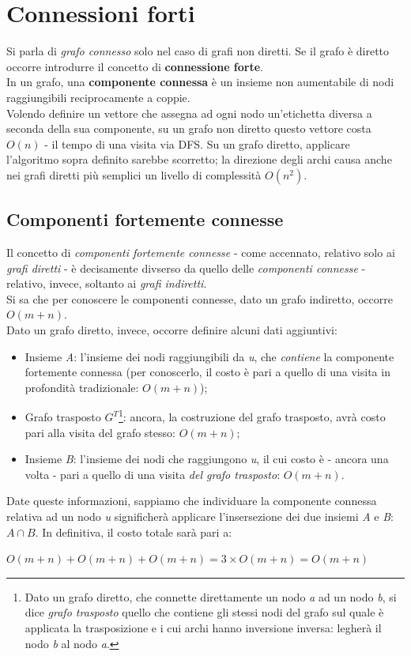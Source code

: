 \section{Connessioni forti}
Si parla di \textit{grafo connesso} solo nel caso di grafi non diretti. Se il grafo è diretto occorre introdurre il concetto di \textbf{connessione forte}. \\
In un grafo, una \textbf{componente connessa} è un insieme non aumentabile di nodi raggiungibili reciprocamente a coppie. \\
Volendo definire un vettore che assegna ad ogni nodo un'etichetta diversa a seconda della sua componente, su un grafo non diretto questo vettore costa $ O(n) $ - il tempo di una visita via DFS.
Su un grafo diretto, applicare l'algoritmo sopra definito sarebbe scorretto; la direzione degli archi causa anche nei grafi diretti più semplici un livello di complessità $ O(n^2) $.


\subsection{Componenti fortemente connesse}
Il concetto di \textit{componenti fortemente connesse} - come accennato, relativo solo ai \textit{grafi diretti} - è decisamente divserso da quello delle \textit{componenti connesse} - relativo, invece, soltanto ai \textit{grafi indiretti}. \\
Si sa che per conoscere le componenti connesse, dato un grafo indiretto, occorre $ O(m+n)$. \\
Dato un grafo diretto, invece, occorre definire alcuni dati aggiuntivi:
\begin{itemize}
    \item Insieme \textit{A}: l'insieme dei nodi raggiungibili da \textit{u}, che \textit{contiene} la componente fortemente connessa (per conoscerlo, il costo è pari a quello di una visita in profondità tradizionale: $O(m+n)$);
    \item Grafo trasposto $G^T$\footnote{Dato un grafo diretto, che connette direttamente un nodo \textit{a} ad un nodo \textit{b}, si dice \textit{grafo trasposto} quello che contiene gli stessi nodi del grafo sul quale è applicata la trasposizione e i cui archi hanno inversione inversa: legherà il nodo \textit{b} al nodo \textit{a}.}: ancora, la costruzione del grafo trasposto, avrà costo pari alla visita del grafo stesso: $O(m+n)$;
    \item Insieme \textit{B}: l'insieme dei nodi che raggiungono \textit{u}, il cui costo è - ancora una volta - pari a quello di una visita \textit{del grafo trasposto}: $O(m+n)$.
\end{itemize}
Date queste informazioni, sappiamo che individuare la componente connessa relativa ad un nodo \textit{u} significherà applicare l'insersezione dei due insiemi \textit{A} e \textit{B}: $A\cap B$.
In definitiva, il costo totale sarà pari a: \\
\begin{center}
    $ O(m+n) + O(m+n) + O(m+n) = 3\times O(m+n) = O(m+n) $
\end{center}
